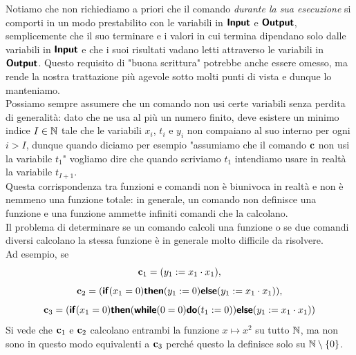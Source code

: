\documentclass[openany]{book}
\begin{document}
Notiamo che non richiediamo a priori che il comando \textit{durante la sua esecuzione} si comporti in un modo prestabilito con le variabili in $\text{\sffamily\textbf{Input}}$ e $\text{\sffamily\textbf{Output}}$, semplicemente che il suo terminare e i valori in cui termina dipendano solo dalle variabili in $\text{\sffamily\textbf{Input}}$ e che i suoi risultati vadano letti attraverso le variabili in $\text{\sffamily\textbf{Output}}$. Questo requisito di "buona scrittura" potrebbe anche essere omesso, ma rende la nostra trattazione più agevole sotto molti punti di vista e dunque lo manteniamo.\\
Possiamo sempre assumere che un comando non usi certe variabili senza perdita di generalità: dato che ne usa al più un numero finito, deve esistere un minimo indice $I \in \mathbb{N}$ tale che le variabili $x_i$, $t_i$ e $y_i$ non compaiano al suo interno per ogni $i > I$, dunque quando diciamo per esempio "assumiamo che il comando $\mathbf{c}$ non usi la variabile $t_1$" vogliamo dire che quando scriviamo $t_1$ intendiamo usare in realtà la variabile $t_{I + 1 }$.\\
Questa corrispondenza tra funzioni e comandi non è biunivoca in realtà e non è nemmeno una funzione totale: in generale, un comando non definisce una funzione e una funzione ammette infiniti comandi che la calcolano.\\ 
Il problema di determinare se un comando calcoli una funzione o se due comandi diversi calcolano la stessa funzione è in generale molto difficile da risolvere.\\
Ad esempio, se 
\[ \mathbf{c}_1 = (y_1 := x_1\cdot x_1),\]
\[ \mathbf{c}_2 = (\text{\sffamily\textbf{if}}(x_1 = 0)\text{\sffamily\textbf{then}}(y_1 := 0)\text{\sffamily\textbf{else}}(y_1 := x_1\cdot x_1)),\]
\[ \mathbf{c}_3 = \left(\text{\sffamily\textbf{if}}(x_1 = 0)\text{\sffamily\textbf{then}}(\text{\sffamily\textbf{while}}(0 = 0)\text{\sffamily\textbf{do}}(t_1 := 0) )\text{\sffamily\textbf{else}}(y_1 := x_1\cdot x_1)\right) \]
Si vede che $\mathbf{c}_1$ e $\mathbf{c}_2$ calcolano entrambi la funzione $x\mapsto x^2$ su tutto $\mathbb{N}$, ma non sono in questo modo equivalenti a $\mathbf{c}_3$ perché questo la definisce solo su $\mathbb{N}\setminus\{0\}$.
\end{document}
